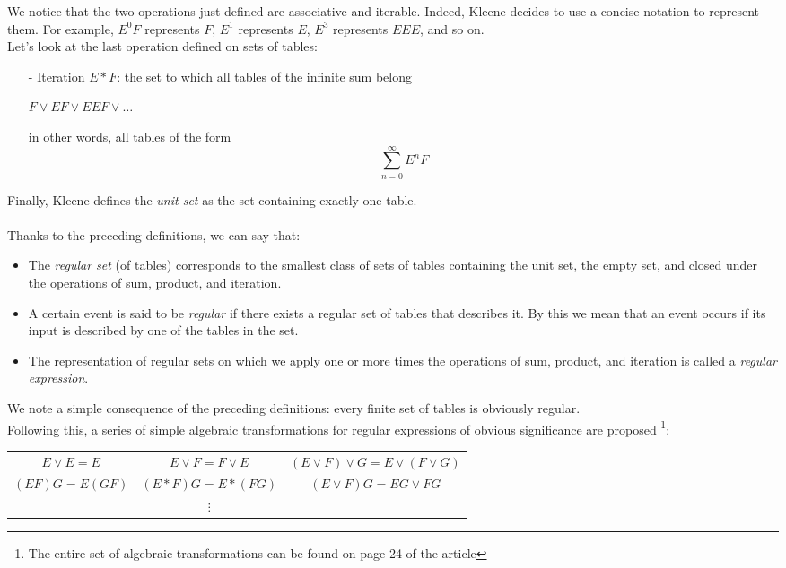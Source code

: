 \documentclass[10pt]{article}
\begin{document}
We notice that the two operations just defined are associative and iterable. Indeed, Kleene decides to use a concise notation to represent them. For example, $E^0F$ represents $F$, $E^1$ represents $E$, $E^3$ represents $EEE$, and so on.\\
Let's look at the last operation defined on sets of tables:
\begin{itemize}
	\item[-] Iteration $E*F$: the set to which all tables of the infinite sum belong
	\begin{center}
		$F \vee EF \vee EEF \vee \ldots$
	\end{center}
	in other words, all tables of the form
	\[
	\sum_{n=0}^\infty E^n F
	\]
\end{itemize}
Finally, Kleene defines the \emph{unit set} as the set containing exactly one table.\\
\\
Thanks to the preceding definitions, we can say that:
\begin{itemize}
	\item The \emph{regular set} (of tables) corresponds to the smallest class of sets of tables containing the unit set, the empty set, and closed under the operations of sum, product, and iteration.
	\item A certain event is said to be \emph{regular} if there exists a regular set of tables that describes it. By this we mean that an event occurs if its input is described by one of the tables in the set.
	\item The representation of regular sets on which we apply one or more times the operations of sum, product, and iteration is called a \emph{regular expression}.
\end{itemize}
We note a simple consequence of the preceding definitions: every finite set of tables is obviously regular.\\
Following this, a series of simple algebraic transformations for regular expressions of obvious significance are proposed \footnote{The entire set of algebraic transformations can be found on page 24 of the article}:
\begin{table}[!h]
	\begin{tabular}{ccc}
		$E \vee E = E$ & $E \vee F = F \vee E$ & $(E \vee F) \vee G = E \vee (F \vee G)$ \\
		$(EF)G = E(GF)$ & $(E*F)G = E*(FG)$ & $(E \vee F)G = EG \vee FG$ \\
		& $\vdots$ & \\
	\end{tabular}
\end{table}
\end{document}
